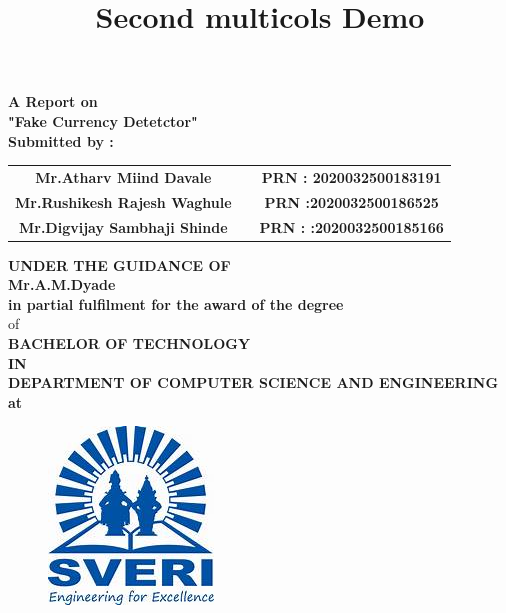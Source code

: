 \documentclass[12pt]{article}
\title{Second multicols Demo}
\begin{document}
 \begin{center}
 \large \textbf {A Report on}\\[2mm]
 \LARGE \textbf {"Fake Currency Detetctor"}\\[7mm]
 
 \textbf{Submitted by :}\\[2mm]
 \end{center}
 
 
 \begin{tabular}{ c c c } 
 \textbf{Mr.Atharv Miind Davale} & \hspace{1.1in} & \textbf{ PRN :  2020032500183191} \\ [1mm] 
 \textbf {Mr.Rushikesh Rajesh Waghule} & \hspace{1.1in} & \textbf{PRN :2020032500186525}\\[1mm]
 \textbf{ Mr.Digvijay Sambhaji Shinde } & \hspace{1.1in}  & \textbf{PRN : :2020032500185166}\\[7mm]
 \end{tabular} 
 
 
 
 \begin{center}
 \large \textbf {UNDER THE GUIDANCE OF }\\[2mm]
 \large \textbf {Mr.A.M.Dyade}\\[7mm]
 \textbf {in partial fulfilment for the award of the degree} \\[2mm] of \\[2mm]
 
 \large \textbf {BACHELOR OF TECHNOLOGY}\\[2mm]
 \textbf {IN}\\[2mm]
 \textbf {DEPARTMENT OF COMPUTER SCIENCE AND ENGINEERING}\\
 \textbf {at}
 \end{center}
 
 \begin{figure}[h]
 \centering
 \includegraphics[scale=1]{sveri2logo}
\end{figure} 
\end{document}
